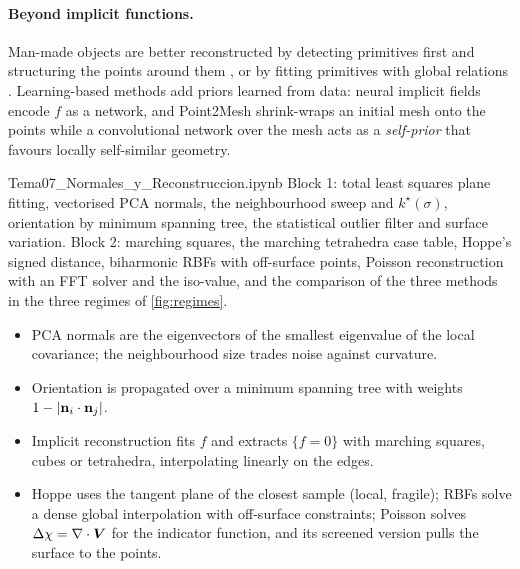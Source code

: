 
\paragraph{Beyond implicit functions.} Man-made objects are better reconstructed by detecting
primitives first and structuring the points around them \citep{Lafarge2013}, or by fitting
primitives with global relations \citep{Li2011}. Learning-based methods add priors learned from
data: neural implicit fields encode $f$ as a network, and Point2Mesh \citep{Hanocka2020} shrink-wraps
an initial mesh onto the points while a convolutional network over the mesh acts as a
\emph{self-prior} that favours locally self-similar geometry.

\begin{notebook}{Tema07\_Normales\_y\_Reconstruccion.ipynb}
Block 1: total least squares plane fitting, vectorised PCA normals, the neighbourhood sweep and
$k^\star(\sigma)$, orientation by minimum spanning tree, the statistical outlier filter and surface
variation. Block 2: marching squares, the marching tetrahedra case table, Hoppe's signed distance,
biharmonic RBFs with off-surface points, Poisson reconstruction with an FFT solver and the
iso-value, and the comparison of the three methods in the three regimes of \cref{fig:regimes}.
\end{notebook}

\begin{keypoints}
\begin{itemize}[leftmargin=*]
  \item PCA normals are the eigenvectors of the smallest eigenvalue of the local covariance; the
  neighbourhood size trades noise against curvature.
  \item Orientation is propagated over a minimum spanning tree with weights $1-\left\lvert \mathbf{n}_i\cdot\mathbf{n}_j\right\rvert$.
  \item Implicit reconstruction fits $f$ and extracts $\{f=0\}$ with marching squares, cubes or
  tetrahedra, interpolating linearly on the edges.
  \item Hoppe uses the tangent plane of the closest sample (local, fragile); RBFs solve a dense
  global interpolation with off-surface constraints; Poisson solves $\Delta\chi=\nabla\cdot\bm V$ for the
  indicator function, and its screened version pulls the surface to the points.
\end{itemize}
\end{keypoints}


